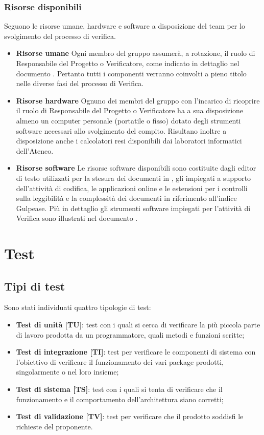 		\subsubsection{Risorse disponibili}
		Seguono le risorse umane, hardware e software a disposizione del team per lo svolgimento del processo di verifica.
		\begin{itemize}
			\item \textbf{Risorse umane}
			Ogni membro del gruppo assumerà, a rotazione, il ruolo di Responsabile del Progetto o Verificatore, come indicato in dettaglio nel documento \PdP. Pertanto tutti i componenti verranno coinvolti a pieno titolo nelle diverse fasi del processo di Verifica.
			\item \textbf{Risorse hardware}
			Ognuno dei membri del gruppo con l'incarico di ricoprire il ruolo di Responsabile del Progetto o Verificatore ha a sua disposizione almeno un computer personale (portatile o fisso) dotato degli strumenti software necessari allo svolgimento del compito. Risultano inoltre a disposizione anche i calcolatori resi disponibili dai laboratori informatici dell'Ateneo.
			\item \textbf{Risorse software}
			Le risorse software disponibili sono costituite dagli editor di testo utilizzati per la stesura dei documenti in , gli  impiegati a supporto dell'attività di codifica, le applicazioni online e le estensioni per i controlli sulla leggibilità e la complessità dei documenti in riferimento all'indice Gulpease. Più in dettaglio gli strumenti software impiegati per l'attività di Verifica sono illustrati nel documento \NdP.
			\end{itemize}
		


\section{Test}
	\subsection{Tipi di test}
	Sono stati individuati quattro tipologie di test:
	\begin{itemize}
		\item \textbf{Test di unità [TU]}: test con i quali si cerca di verificare la più piccola parte di lavoro prodotta da un programmatore, quali metodi e funzioni scritte;
		\item \textbf{Test di integrazione [TI]}: test per verificare le componenti di sistema con l'obiettivo di verificare il funzionamento dei vari package prodotti, singolarmente o nel loro insieme;
		\item \textbf{Test di sistema [TS]}: test con i quali si tenta di verificare che il funzionamento e il comportamento dell'architettura siano corretti;
		\item \textbf{Test di validazione [TV]}: test per verificare che il prodotto soddisfi le richieste del proponente.
	\end{itemize}

